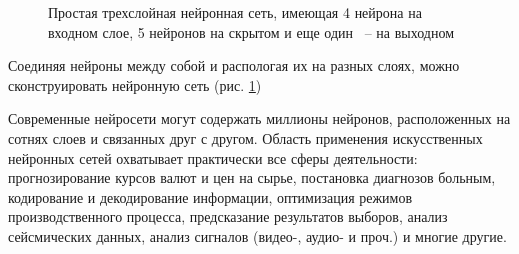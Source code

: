 \documentclass[a4paper, 12pt]{article}
\begin{document}
\begin{figure}[htb!]
\centering
\def\layersep{3cm}
\caption{Простая трехслойная нейронная сеть, имеющая 4 нейрона на входном слое, 5 нейронов на скрытом и еще один ~-- на выходном}
\label{simple_nn}
\end{figure}
Соединяя нейроны между собой и распологая их на разных слоях, можно сконструировать нейронную сеть (рис. \ref{simple_nn})

\newpage 
Современные нейросети могут содержать миллионы нейронов, расположенных на сотнях слоев и связанных друг с другом. Область применения искусственных нейронных сетей охватывает практически все сферы деятельности: прогнозирование курсов валют и цен на сырье, постановка диагнозов больным, кодирование и декодирование информации, оптимизация режимов производственного процесса, предсказание результатов выборов, анализ сейсмических данных, анализ сигналов (видео-, аудио- и проч.) и многие другие. 
\end{document}
